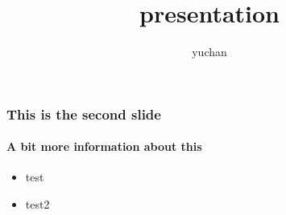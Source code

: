 \documentclass[dvipdfmx,11pt]{beamer}
\title{presentation}
\author{yuchan}
\begin{document}
\begin{frame}
  \frametitle{}
  \titlepage
\end{frame}

\begin{frame}
  \frametitle{This is the second slide}
  \framesubtitle{A bit more information about this}

  \begin{itemize}
    \item test
    \item test2
  \end{itemize}
\end{frame}
\end{document}
